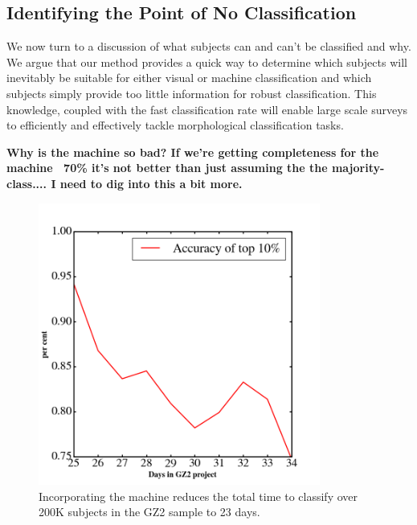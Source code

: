 \documentclass[twocolumn]{aastex6}
\begin{document}
\subsection{Identifying the Point of No Classification}
We now turn to a discussion of what subjects can and can't be classified and why. 
We argue that our method provides a quick way to determine which subjects will
inevitably be suitable for either visual or machine classification and which subjects
simply provide too little information for robust classification. This knowledge, coupled
with the fast classification rate will enable large scale surveys to efficiently and effectively
tackle morphological classification tasks. 

 \textbf{Why is the machine so bad? If we're getting completeness for the machine ~70\% it's not better than just assuming the the majority-class.... I need to dig into this a bit more.}



\begin{figure}[t!]
\includegraphics[width=3.65in]{figures/MLevaluation_GZ2_sup_PLPD5_p5_flipfeature2b_RF_accuracy.png}
\caption{Incorporating the machine reduces the total time to classify over 200K subjects in the GZ2 sample to 23 days. \label{fig: machine accuracy}}
\end{figure}
\end{document}
